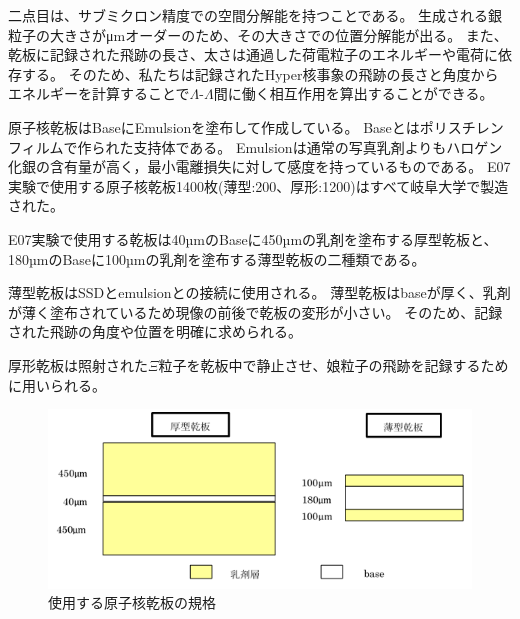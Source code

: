 \documentclass[12pt,a4paper]{jarticle}
\begin{document}
二点目は、サブミクロン精度での空間分解能を持つことである。
生成される銀粒子の大きさがμmオーダーのため、その大きさでの位置分解能が出る。
また、乾板に記録された飛跡の長さ、太さは通過した荷電粒子のエネルギーや電荷に依存する。
そのため、私たちは記録されたHyper核事象の飛跡の長さと角度からエネルギーを計算することで$\Lambda$-$\Lambda$間に働く相互作用を算出することができる。
\par
原子核乾板はBaseにEmulsionを塗布して作成している。
Baseとはポリスチレンフィルムで作られた支持体である。
Emulsionは通常の写真乳剤よりもハロゲン化銀の含有量が高く，最小電離損失に対して感度を持っているものである。
E07実験で使用する原子核乾板1400枚(薄型:200、厚形:1200)はすべて岐阜大学で製造された。
\par
E07実験で使用する乾板は40µmのBaseに450µmの乳剤を塗布する厚型乾板と、180µmのBaseに100µmの乳剤を塗布する薄型乾板の二種類である。
\par
薄型乾板はSSDとemulsionとの接続に使用される。
薄型乾板はbaseが厚く、乳剤が薄く塗布されているため現像の前後で乾板の変形が小さい。
そのため、記録された飛跡の角度や位置を明確に求められる。
\par
厚形乾板は照射された$\Xi$粒子を乾板中で静止させ、娘粒子の飛跡を記録するために用いられる。
\par
\begin{figure}[htbp]
    \begin{center}
     \includegraphics[width=140mm]{emulsionorder.png}
    \end{center}
    \caption{使用する原子核乾板の規格\label{fig:emulsionorder}}
\end{figure}
\end{document}
